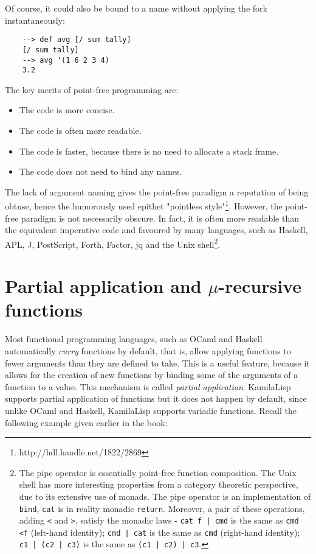 Of course, it could also be bound to a name without applying the fork instantaneously:

\begin{Verbatim}
    --> def avg [/ sum tally]
    [/ sum tally]
    --> avg '(1 6 2 3 4)
    3.2
\end{Verbatim}

The key merits of point-free programming are:

\begin{itemize}
    \item The code is more concise.
    \item The code is often more readable.
    \item The code is faster, because there is no need to allocate a stack frame.
    \item The code does not need to bind any names.
\end{itemize}

The lack of argument naming gives the point-free paradigm a reputation of being obtuse, hence the humorously used epithet "pointless style"\footnote{http://hdl.handle.net/1822/2869}. However, the point-free paradigm is not necessarily obscure. In fact, it is often more readable than the equivalent imperative code and favoured by many languages, such as Haskell, APL, J, PostScript, Forth, Factor, jq and the Unix shell\footnote{The pipe operator is essentially point-free function composition. The Unix shell has more interesting properties from a category theoretic perspective, due to its extensive use of monads. The pipe operator is an implementation of \verb|bind|, \verb|cat| is in reality monadic \verb|return|. Moreover, a pair of these operations, adding \verb|<| and \verb|>|, satisfy the monadic laws - \verb$cat f | cmd$ is the same as \verb|cmd <f| (left-hand identity); \verb$cmd | cat$ is the same as \verb|cmd| (right-hand identity); \verb$c1 | (c2 | c3)$ is the same as \verb$(c1 | c2) | c3$.}.

\section{Partial application and \texorpdfstring{$\mu$}{mu}-recursive functions}

Most functional programming languages, such as OCaml and Haskell automatically \textit{curry} functions by default, that is, allow applying functions to fewer arguments than they are defined to take. This is a useful feature, because it allows for the creation of new functions by binding some of the arguments of a function to a value. This mechanism is called \textit{partial application}. KamilaLisp supports partial application of functions but it does not happen by default, since unlike OCaml and Haskell, KamilaLisp supports variadic functions. Recall the following example given earlier in the book:

